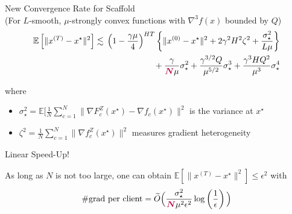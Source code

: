 \documentclass[aspectratio=169,12pt]{beamer}
\begin{document}
\begin{frame}{New Convergence Rate for Scaffold\\[-0.5em]
    \small (For $L$-smooth, $\mu$-strongly convex functions with $\nabla^3 f(x)$ bounded by $Q$)}
\begin{align*}
\mathbb{E}\left[ \| x^{(T)} - x^\star \|^2 \right] 
& \lesssim{} \left( 1 - \frac{\gamma \mu}{4} \right)^{HT}
\left\{ 
\| x^{(0)} - x^\star \|^2
+
2\gamma^2 H^2 \zeta^2
+
\frac{ \sigma_\star^2 }{L\mu}
\right\}
\\ &  \quad\quad\quad\quad\quad\quad\quad
+ 
\frac{\gamma }{\textcolor{purple}{\boldsymbol{N}} \mu} \sigma_\star^2 
+ \frac{ \gamma^{3/2} Q }{\mu^{5/2}} \sigma_\star^3
+ \frac{ \gamma^3 H Q^2}{\mu^3} \sigma_\star^4
\end{align*}


where
\begin{itemize}
\item \small
  $\sigma_\star^2 = \mathbb{E}[ \frac{1}{N} \sum_{c=1}^N \| \nabla F_c^Z(x^\star) - \nabla f_c(x^\star) \|^2$ is the variance at $x^\star$
\item \small
  $\zeta^2 = \frac{1}{N} \sum_{c=1}^N \| \nabla f_c^Z(x^\star) \|^2$ measures gradient heterogeneity
\end{itemize}



\end{frame}

\begin{frame}{Linear Speed-Up!}

  As long as $N$ is not too large, one can obtain $\mathbb{E}\left[ \| x^{(T)} - x^\star \|^2 \right] \le \epsilon^2 $ with
  \begin{align*}
    \# \text{grad per client}
    = \widetilde O\Big( \frac{\sigma_\star^2}{\textcolor{purple}{\boldsymbol{N}} \mu^2 \epsilon^2} 
    \log\left( 
    \frac{1}{\epsilon}
    \right) \Big)
  \end{align*}
  
\end{frame}
\end{document}
